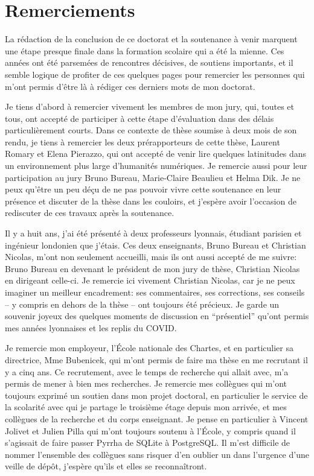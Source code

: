 \chapter*{Remerciements}

La rédaction de la conclusion de ce doctorat et la soutenance à venir marquent une étape presque finale dans la formation scolaire qui a été la mienne. Ces années ont été parsemées de rencontres décisives, de soutiens importants, et il semble logique de profiter de ces quelques pages pour remercier les personnes qui m'ont permis d'être là à rédiger ces derniers mots de mon doctorat. 

Je tiens d'abord à remercier vivement les membres de mon jury, qui, toutes et tous, ont accepté de participer à cette étape d'évaluation dans des délais particulièrement courts. Dans ce contexte de thèse soumise à deux mois de son rendu, je tiens à remercier les deux prérapporteurs de cette thèse, Laurent Romary et Elena Pierazzo, qui ont accepté de venir lire quelques latinitudes dans un environnement plus large d'humanités numériques. Je remercie aussi pour leur participation au jury Bruno Bureau, Marie-Claire Beaulieu et Helma Dik. Je ne peux qu'être un peu déçu de ne pas pouvoir vivre cette soutenance en leur présence et discuter de la thèse dans les couloirs, et j'espère avoir l'occasion de rediscuter de ces travaux après la soutenance.

Il y a huit ans, j'ai été présenté à deux professeurs lyonnais, étudiant parisien et ingénieur londonien que j'étais. Ces deux enseignants, Bruno Bureau et Christian Nicolas, m'ont non seulement accueilli, mais ils ont aussi accepté de me suivre: Bruno Bureau en devenant le président de mon jury de thèse, Christian Nicolas en dirigeant celle-ci. Je remercie ici vivement Christian Nicolas, car je ne peux imaginer un meilleur encadrement: ses commentaires, ses corrections, ses conseils -- y compris en dehors de la thèse -- ont toujours été précieux. Je garde un souvenir joyeux des quelques moments de discussion en \enquote{présentiel} qu'ont permis mes années lyonnaises et les replis du COVID. 

Je remercie mon employeur, l'École nationale des Chartes, et en particulier sa directrice, Mme Bubenicek, qui m'ont permis de faire ma thèse en me recrutant il y a cinq ans. Ce recrutement, avec le temps de recherche qui allait avec, m'a permis de mener à bien mes recherches. Je remercie mes collègues qui m'ont toujours exprimé un soutien dans mon projet doctoral, en particulier le service de la scolarité avec qui je partage le troisième étage depuis mon arrivée, et mes collègues de la recherche et du corps enseignant. Je pense en particulier à Vincent Jolivet et Julien Pilla qui m'ont toujours soutenu à l'École, y compris quand il s'agissait de faire passer Pyrrha de SQLite à PostgreSQL. Il m'est difficile de nommer l'ensemble des collègues sans risquer d'en oublier un dans l'urgence d'une veille de dépôt, j'espère qu'ils et elles se reconnaîtront. 

